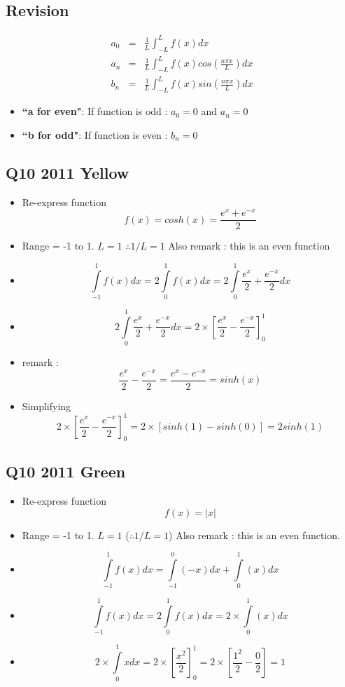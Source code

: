 \documentclass[11pt,a4paper,titlepage,oneside,openany]{article}
\numberwithin{equation}{section}
\numberwithin{algorithm}{section}
\numberwithin{figure}{section}
\numberwithin{table}{section}
\begin{document}
\subsection*{Revision}
\Large{

\begin{eqnarray}
a_0 &=& \frac{1}{L}\int^{L }_{-L} f(x) dx \\
a_n &=& \frac{1}{L}\int^{L }_{-L} f(x) cos(\frac{n\pi x}{L}) dx \\
b_n &=& \frac{1}{L}\int^{L }_{-L} f(x) sin(\frac{n\pi x}{L}) dx
\end{eqnarray}

\begin{itemize}
\item \textbf{ ``a for even"}: If function is odd : $a_0 = 0$ and $a_n=0$
\item \textbf{ ``b for odd"}: If function is even : $b_n=0$
\end{itemize}
}
\subsection*{Q10 2011 Yellow} %
\Large{
\begin{itemize}
\item Re-express function \[f(x) = cosh(x) = \frac{e^{x} + e^{-x}}{2} \]
\item Range = -1 to 1. $L=1$ $\therefore 1/L = 1$ Also remark : this is an even function
\item \[\int\limits^{1}_{-1} f(x) dx = 2\int\limits^{1}_{0} f(x) dx = 2\int\limits^{1}_{0}\frac{e^{x}}{2} + \frac{e^{-x}}{2} dx \]
    \item \[ 2\int\limits^{1}_{0}\frac{e^{x}}{2} + \frac{e^{-x}}{2} dx  = 2\times \left[ \frac{e^{x}}{2} - \frac{e^{-x}}{2} \right]^{1}_{0} \]
\item remark : \[ \frac{e^{x}}{2} - \frac{e^{-x}}{2} = \frac{e^{x} - e^{-x}}{2}= sinh(x )\]
\item Simplifying
\[ 2\times \left[ \frac{e^{x}}{2} - \frac{e^{-x}}{2} \right]^{1}_{0}  = 2\times \left[sinh(1) - sinh(0)\right] = 2sinh(1) \]
\end{itemize}
}
\newpage
\subsection*{Q10 2011 Green}
\Large{
\begin{itemize}
\item Re-express function \[f(x) = |x|  \]
\item Range = -1 to 1. $L=1$ ($\therefore 1/L = 1$) Also remark : this is an even function.
\item \[\int\limits^{1}_{-1} f(x) dx = \int\limits^{0}_{-1} (-x) dx + \int\limits^{1}_{0} (x) dx \]
\item \[\int\limits^{1}_{-1} f(x) dx = 2\int\limits^{1}_{0} f(x) dx = 2 \times \int\limits^{1}_{0} (x) dx \]

\item \[ 2 \times \int\limits^{1}_{0} x dx = 2 \times \left[ \frac{x^2}{2} \right]^{1}_{0} =
2 \times \left[ \frac{1^2}{2} - \frac{0}{2} \right]  = 1 \]
\end{itemize}
}
\end{document}
